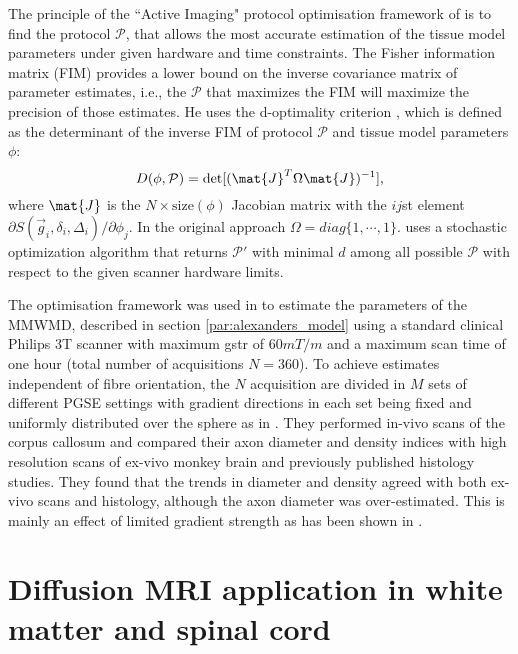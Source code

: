 The principle of the ``Active Imaging" protocol optimisation framework of \cite{Alexander:2008} is to find the protocol $\mathcal{P}$, that allows the most accurate estimation of the tissue model parameters under given hardware and time constraints. The Fisher information matrix (FIM) provides a lower bound on the inverse covariance matrix of parameter estimates, i.e., the $\mathcal{P}$ that maximizes the FIM will maximize the precision of those estimates. He uses the d-optimality criterion \citep{OBrien:2003}, which is defined as the determinant of the inverse FIM of protocol $\mathcal{P}$ and tissue model parameters $\phi$:
\begin{equation}
	D(\phi,\mathcal{P})=\det[(\mat{J}^T\Omega\mat{J})^{-1}], 
	\label{eq-optimality}
\end{equation}
where $\mat{J}$ is the $N\times \mbox{size}(\phi)$ Jacobian matrix with the $ij$st element $\partial S(\vec{g}_i,\delta_i,\Delta_i) / \partial \phi_j$. In the original approach $\Omega=diag\{1,\cdots,1\}$. \citet{Alexander:2008} uses a stochastic optimization algorithm \citep{Zelinka:2010} that returns $\mathcal{P}'$ with minimal $d$ among all possible $\mathcal{P}$ with respect to the given scanner hardware limits.

The optimisation framework was used in \citet{Alexander:2010} to estimate the parameters of the \gls{MMWMD}, described in section \ref{par:alexanders_model} using a standard clinical Philips 3T scanner with maximum {\gls{gstr}} of $60mT/m$ and a maximum scan time of one hour (total number of acquisitions $N=360$). To achieve estimates independent of fibre orientation, the $N$ acquisition are divided in $M$ sets of different PGSE settings with gradient directions in each set being fixed and uniformly distributed over the sphere as in \cite{Jones:2004a}. They performed in-vivo scans of the corpus callosum and compared their axon diameter and density indices with high resolution scans of ex-vivo monkey brain and previously published histology studies. They found that the trends in diameter and density agreed with both ex-vivo scans and histology, although the axon diameter was over-estimated. This is mainly an effect of limited gradient strength as has been shown in \cite{Dyrby:2010}.  


\section{Diffusion MRI application in white matter and spinal cord}
